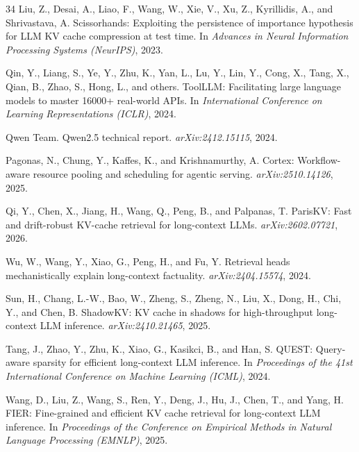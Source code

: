 \documentclass{article}
\begin{document}
\begin{thebibliography}{34}
Liu, Z., Desai, A., Liao, F., Wang, W., Xie, V., Xu, Z.,
  Kyrillidis, A., and Shrivastava, A.
\newblock Scissorhands: Exploiting the persistence of importance
  hypothesis for LLM KV cache compression at test time.
\newblock In \emph{Advances in Neural Information Processing Systems
  (NeurIPS)}, 2023.

Qin, Y., Liang, S., Ye, Y., Zhu, K., Yan, L., Lu, Y., Lin, Y.,
  Cong, X., Tang, X., Qian, B., Zhao, S., Hong, L., and others.
\newblock ToolLLM: Facilitating large language models to master
  16000+ real-world APIs.
\newblock In \emph{International Conference on Learning
  Representations (ICLR)}, 2024.

Qwen Team.
\newblock Qwen2.5 technical report.
\newblock \emph{arXiv:2412.15115}, 2024.

Pagonas, N., Chung, Y., Kaffes, K., and Krishnamurthy, A.
\newblock Cortex: Workflow-aware resource pooling and scheduling for
  agentic serving.
\newblock \emph{arXiv:2510.14126}, 2025.

Qi, Y., Chen, X., Jiang, H., Wang, Q., Peng, B., and Palpanas, T.
\newblock ParisKV: Fast and drift-robust KV-cache retrieval for
  long-context LLMs.
\newblock \emph{arXiv:2602.07721}, 2026.

Wu, W., Wang, Y., Xiao, G., Peng, H., and Fu, Y.
\newblock Retrieval heads mechanistically explain long-context factuality.
\newblock \emph{arXiv:2404.15574}, 2024.

Sun, H., Chang, L.-W., Bao, W., Zheng, S., Zheng, N., Liu, X., Dong,
  H., Chi, Y., and Chen, B.
\newblock ShadowKV: KV cache in shadows for high-throughput long-context
  LLM inference.
\newblock \emph{arXiv:2410.21465}, 2025.

Tang, J., Zhao, Y., Zhu, K., Xiao, G., Kasikci, B., and Han, S.
\newblock QUEST: Query-aware sparsity for efficient long-context LLM
  inference.
\newblock In \emph{Proceedings of the 41st International Conference on
  Machine Learning (ICML)}, 2024.

Wang, D., Liu, Z., Wang, S., Ren, Y., Deng, J., Hu, J., Chen, T., and
  Yang, H.
\newblock FIER: Fine-grained and efficient KV cache retrieval for
  long-context LLM inference.
\newblock In \emph{Proceedings of the Conference on Empirical Methods in
  Natural Language Processing (EMNLP)}, 2025.


\end{thebibliography}
\end{document}
